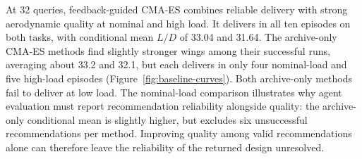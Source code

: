 \documentclass{article} %
\begin{document}
At 32 queries, feedback-guided CMA-ES combines reliable delivery with strong
aerodynamic quality at nominal and high load. It delivers in all ten episodes
on both tasks, with conditional mean $L/D$ of 33.04 and 31.64. The archive-only CMA-ES methods find slightly stronger wings among their
successful runs, averaging about 33.2 and 32.1, but each delivers in only four
nominal-load and five high-load episodes (Figure~\ref{fig:baseline-curves}).
Both archive-only methods fail to deliver at low load.
The nominal-load comparison illustrates why agent evaluation must report
recommendation reliability alongside quality: the archive-only conditional
mean is slightly higher, but excludes six unsuccessful recommendations per
method. Improving quality among valid recommendations alone can therefore
leave the reliability of the returned design unresolved.
\end{document}
